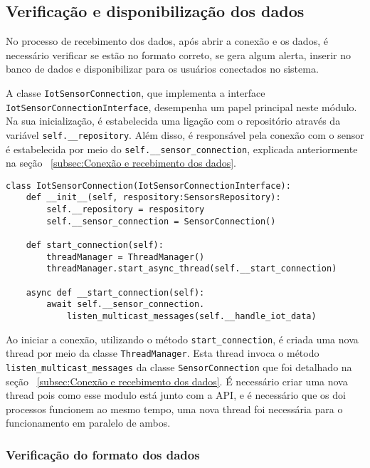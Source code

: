 \subsection[Verificação e disponibilização dos dados]{Verificação e disponibilização dos dados}\label{subsec:checkDataReceived}
No processo de recebimento dos dados, após abrir a conexão e os dados, é necessário verificar se estão no formato correto, se gera algum alerta, inserir no banco de dados e disponibilizar para os usuários conectados no sistema.

A classe \texttt{IotSensorConnection}, que implementa a interface \texttt{IotSensorConnectionInterface}, desempenha um papel principal neste módulo. Na sua inicialização, é estabelecida uma ligação com o repositório através da variável \texttt{self.\_\_repository}. Além disso, é responsável pela conexão com o sensor é estabelecida por meio do \texttt{self.\_\_sensor\_connection}, explicada anteriormente na seção ~\ref{subsec:Conexão e recebimento dos dados}.

\begin{verbatim}
class IotSensorConnection(IotSensorConnectionInterface):
    def __init__(self, respository:SensorsRepository):
        self.__repository = respository
        self.__sensor_connection = SensorConnection()
    
    def start_connection(self):
        threadManager = ThreadManager()
        threadManager.start_async_thread(self.__start_connection)
    
    async def __start_connection(self):
        await self.__sensor_connection.
            listen_multicast_messages(self.__handle_iot_data)
\end{verbatim}

Ao iniciar a conexão, utilizando o método \texttt{start\_connection}, é criada uma nova thread por meio da classe \texttt{ThreadManager}. Esta thread invoca o método \texttt{listen\_multicast\_messages} da classe \texttt{SensorConnection} que foi detalhado na seção ~\ref{subsec:Conexão e recebimento dos dados}. É necessário criar uma nova thread pois como esse modulo está junto com a API, e é necessário que os doi processos funcionem ao mesmo tempo, uma nova thread foi necessária para o funcionamento em paralelo de ambos.

\subsubsection{Verificação do formato dos dados}

